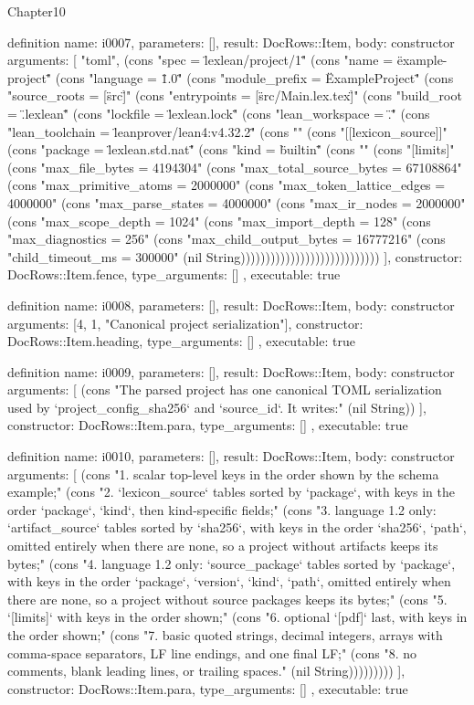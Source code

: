 \begin{lexlean}{Chapter10}
\begin{semanticmodule}
definition{
  name: i0007,
  parameters: [],
  result: DocRows::Item,
  body: constructor{
    arguments: [
      "toml",
      (cons "spec = \"lexlean/project/1\"" (cons "name = \"example-project\"" (cons "language = \"1.0\"" (cons "module_prefix = \"ExampleProject\"" (cons "source_roots = [\"src\"]" (cons "entrypoints = [\"src/Main.lex.tex\"]" (cons "build_root = \".lexlean\"" (cons "lockfile = \"lexlean.lock\"" (cons "lean_workspace = \".\"" (cons "lean_toolchain = \"leanprover/lean4:v4.32.2\"" (cons "" (cons "[[lexicon_source]]" (cons "package = \"lexlean.std.nat\"" (cons "kind = \"builtin\"" (cons "" (cons "[limits]" (cons "max_file_bytes = 4194304" (cons "max_total_source_bytes = 67108864" (cons "max_primitive_atoms = 2000000" (cons "max_token_lattice_edges = 4000000" (cons "max_parse_states = 4000000" (cons "max_ir_nodes = 2000000" (cons "max_scope_depth = 1024" (cons "max_import_depth = 128" (cons "max_diagnostics = 256" (cons "max_child_output_bytes = 16777216" (cons "child_timeout_ms = 300000" (nil String))))))))))))))))))))))))))))
    ],
    constructor: DocRows::Item.fence,
    type_arguments: []
  },
  executable: true
}

definition{
  name: i0008,
  parameters: [],
  result: DocRows::Item,
  body: constructor{
    arguments: [4, 1, "Canonical project serialization"],
    constructor: DocRows::Item.heading,
    type_arguments: []
  },
  executable: true
}

definition{
  name: i0009,
  parameters: [],
  result: DocRows::Item,
  body: constructor{
    arguments: [
      (cons "The parsed project has one canonical TOML serialization used by `project_config_sha256` and `source_id`. It writes:" (nil String))
    ],
    constructor: DocRows::Item.para,
    type_arguments: []
  },
  executable: true
}

definition{
  name: i0010,
  parameters: [],
  result: DocRows::Item,
  body: constructor{
    arguments: [
      (cons "1. scalar top-level keys in the order shown by the schema example;" (cons "2. `lexicon_source` tables sorted by `package`, with keys in the order `package`, `kind`, then kind-specific fields;" (cons "3. language 1.2 only: `artifact_source` tables sorted by `sha256`, with keys in the order `sha256`, `path`, omitted entirely when there are none, so a project without artifacts keeps its bytes;" (cons "4. language 1.2 only: `source_package` tables sorted by `package`, with keys in the order `package`, `version`, `kind`, `path`, omitted entirely when there are none, so a project without source packages keeps its bytes;" (cons "5. `[limits]` with keys in the order shown;" (cons "6. optional `[pdf]` last, with keys in the order shown;" (cons "7. basic quoted strings, decimal integers, arrays with comma-space separators, LF line endings, and one final LF;" (cons "8. no comments, blank leading lines, or trailing spaces." (nil String)))))))))
    ],
    constructor: DocRows::Item.para,
    type_arguments: []
  },
  executable: true
}


\end{semanticmodule}
\end{lexlean}
